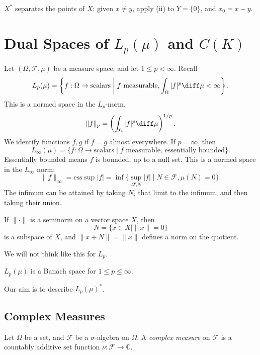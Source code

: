 \documentclass[12pt]{article}
\begin{document}
\begin{remark}
	$X^\ast$ separates the points of $X$: given $x \neq y$, apply (ii) to $Y = \{0\}$, and $x_0 = x - y$.
\end{remark}

\newpage

\section{Dual Spaces of \texorpdfstring{$L_p(\mu)$}{Lp(mu)} and \texorpdfstring{$C(K)$}{C(K)}}%
\label{sec:ds}

Let $(\Omega, \mathcal{F}, \mu)$ be a measure space, and let $1 \leq p < \infty$. Recall
\[
	L_p(\mu) = \left\{f : \Omega \to \text{scalars} \biggm| f \text{ measurable}, \int_{\Omega} |f|^p \diff \mu < \infty\right\}.
\]
This is a normed space in the $L_p$-norm,
\[
\|f\|_p = \left( \int_{\Omega} |f|^p \diff \mu \right)^{1/p}.
\]
We identify functions $f, g$ if $f = g$ almost everywhere. If $p = \infty$, then
\[
	L_\infty(\mu) = \{f : \Omega \to \text{scalars} \mid f \text{ measurable, essentially bounded}\}.
\]
Essentially bounded means $f$ is bounded, up to a null set. This is a normed space in the $L_\infty$ norm:
\[
	\|f\|_\infty = \mathrm{ess} \sup |f| = \inf \{ \sup_{\Omega \setminus N} |f| \mid N \in \mathcal{F}, \mu(N) = 0\}.
\]
The infimum can be attained by taking $N_i$ that limit to the infimum, and then taking their union.

\begin{remark}
	If $\|\cdot\|$ is a seminorm on a vector space $X$, then
	\[
		N = \{x \in X \mid \|x\| = 0\}
	\]
	is a subspace of $X$, and $\|x + N\| = \|x\|$ defines a norm on the quotient.
\end{remark}

We will not think like this for $L_p$.

\begin{theorem}
	$L_p(\mu)$ is a Banach space for $1 \leq p \leq \infty$.
\end{theorem}

Our aim is to describe $L_p(\mu)^\ast$.

\subsection{Complex Measures}%
\label{sub:comp_m}

Let $\Omega$ be a set, and $\mathcal{F}$ be a $\sigma$-algebra on $\Omega$. A \emph{complex measure} on $\mathcal{F}$ is a countably additive set function $\nu : \mathcal{F} \to \mathbb{C}$.
\end{document}

